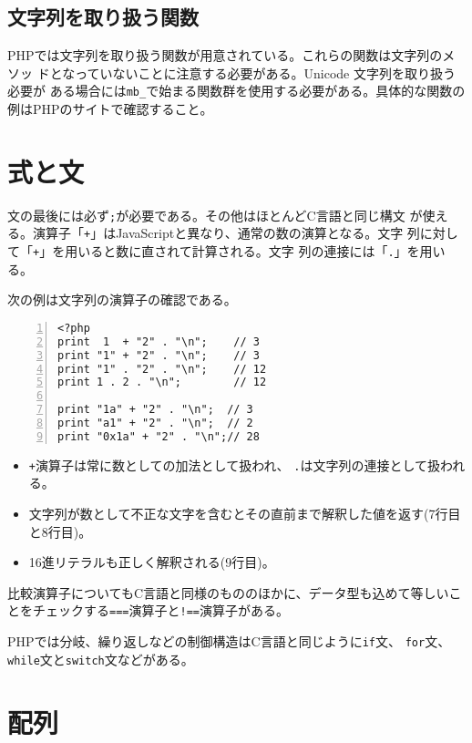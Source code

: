 \subsection{文字列を取り扱う関数}
PHPでは文字列を取り扱う関数が用意されている。これらの関数は文字列のメソッ
ドとなっていないことに注意する必要がある。Unicode 文字列を取り扱う必要が
ある場合には\Verb+mb_+で始まる関数群を使用する必要がある。具体的な関数の
例はPHPのサイトで確認すること。
\section{式と文}
文の最後には必ず\texttt{;}が必要である。その他はほとんどC言語と同じ構文
が使える。演算子「\texttt{+}」はJavaScriptと異なり、通常の数の演算となる。文字
列に対して「\texttt{+}」を用いると数に直されて計算される。文字
列の連接には「\texttt{.}」を用いる。
\begin{Exec}\upshape
次の例は文字列の演算子の確認である。
\begin{Verbatim}[numbers=left]
<?php
print  1  + "2" . "\n";    // 3
print "1" + "2" . "\n";    // 3
print "1" . "2" . "\n";    // 12
print 1 . 2 . "\n";        // 12

print "1a" + "2" . "\n";  // 3
print "a1" + "2" . "\n";  // 2
print "0x1a" + "2" . "\n";// 28
\end{Verbatim}
\begin{itemize}
 \item \texttt{+}演算子は常に数としての加法として扱われ、
 \texttt{.}は文字列の連接として扱われる。
 \item 文字列が数として不正な文字を含むとその直前まで解釈した値を返す(7行目と8行目)。
 \item 16進リテラルも正しく解釈される(9行目)。
\end{itemize}
\end{Exec}
比較演算子についてもC言語と同様のもののほかに、データ型も込めて等しいこ
とをチェックする\texttt{===}演算子と\texttt{!==}演算子がある。



PHPでは分岐、繰り返しなどの制御構造はC言語と同じように\texttt{if}文、
\texttt{for}文、\texttt{while}文と\texttt{switch}文などがある。

\section{配列}
